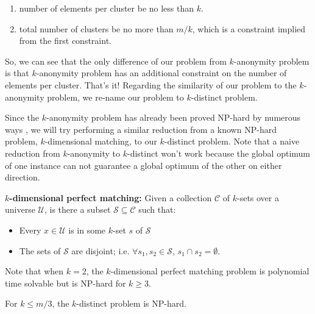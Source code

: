 \begin{enumerate}
\item number of elements per cluster be no less than $k$.

\item total number of clusters be no more than $m/k$, which is a 
constraint implied from the first constraint.
\end{enumerate}

So, we can see that the only difference of our problem from $k$-anonymity
problem is that $k$-anonymity problem has an additional constraint
on the number of elements per cluster. That's it! Regarding the similarity
of our problem to the $k$-anonymity problem, we re-name our problem to 
$k$-distinct problem.

Since the $k$-anonymity problem has already been proved {NP}-hard by
numerous ways \cite{}, we will try performing a similar reduction from
a known {NP}-hard problem, $k$-dimensional matching, to our $k$-distinct
problem. Note that a naive reduction from $k$-anonymity to $k$-distinct
won't work because the global optimum of one instance can not guarantee
a global optimum of the other on either direction.

{\bf $k$-dimensional perfect matching:} Given a collection $\mathcal{C}$
of $k$-sets over a universe $\mathcal{U}$, is there a subset $\mathcal{S}
\subseteq \mathcal{C}$ such that:

\begin{itemize}
\item Every $x \in \mathcal{U}$ is in some $k$-set $s$ of $\mathcal{S}$
\item The sets of $\mathcal{S}$ are disjoint; i.e. $\forall s_1, 
s_2 \in \mathcal{S}$, $s_1 \cap s_2 = \emptyset$.
\end{itemize}

Note that when $k = 2$, the $k$-dimensional perfect matching problem 
is polynomial time solvable but is {NP}-hard for $k \geq 3$.

\begin{theorem}
For $k \leq m/3$, the $k$-distinct problem is {NP}-hard.
\end{theorem}

